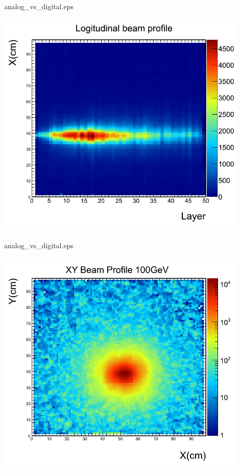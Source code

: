 \begin{frame}{analog\_vs\_digital.eps}
  \centerline{\includegraphics[width=0.9\textwidth]{images/Beam2012Longitudinal}}
\end{frame}
\begin{frame}{analog\_vs\_digital.eps}
  \centerline{\includegraphics[width=0.9\textwidth]{images/Beam2012Transverse}}
\end{frame}
